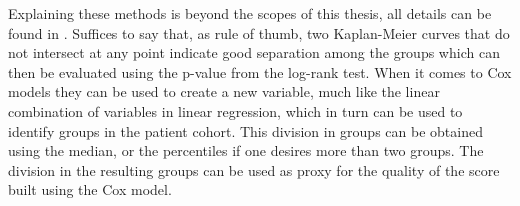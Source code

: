Explaining these methods is beyond the scopes of this thesis, all details can be found in \cite{SurvivalAnalysis}.
Suffices to say that, as rule of thumb, two Kaplan-Meier curves that do not intersect at any point indicate good separation among the groups which can then be evaluated using the p-value from the log-rank test.
When it comes to Cox models they can be used to create a new variable, much like the linear combination of variables in linear regression, which in turn can be used to identify groups in the patient cohort. This division in groups can be obtained using the median, or the percentiles if one desires more than two groups. 
The division in the resulting groups can be used as proxy for the quality of the score built using the Cox model.
